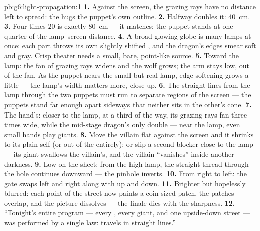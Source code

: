\begin{solution}{pb:g6:light-propagation:1}
\textbf{1.} Against the screen, the grazing rays have no distance
left to spread: the  hugs the puppet's own outline.
\textbf{2.} Halfway doubles it: \qty{40}{cm}.
\textbf{3.} Four times $20$ is exactly \qty{80}{cm} --- it
matches; the puppet stands at one quarter of the lamp--screen
distance.
\textbf{4.} A broad glowing globe is many lamps at once: each
part throws its own slightly shifted , and the dragon's
edges smear soft and gray. Crisp theater needs a small, bare,
point-like source.
\textbf{5.} Toward the lamp: the fan of grazing rays widens and
the wolf grows; the arm stays low, out of the fan. As the puppet
nears the small-but-real lamp, edge softening grows a little ---
the lamp's width matters more, close up.
\textbf{6.} The straight lines from the lamp through the two
puppets must run to separate regions of the screen --- the
puppets stand far enough apart sideways that neither sits in the
other's  cone.
\textbf{7.} The hand's: closer to the lamp, at a third of the
way, its grazing rays fan three times wide, while the mid-stage
dragon's only double --- near the lamp, even small hands play
giants.
\textbf{8.} Move the villain flat against the screen and it
shrinks to its plain self (or out of the  entirely); or slip
a second blocker close to the lamp --- its giant  swallows
the villain's, and the villain ``vanishes'' inside another
darkness.
\textbf{9.} Low on the sheet: from the high lamp, the straight
thread through the hole continues downward --- the pinhole
inverts.
\textbf{10.} From right to left: the gate swaps left and right
along with up and down.
\textbf{11.} Brighter but hopelessly blurred: each point of the
street now paints a coin-sized patch, the patches overlap, and
the picture dissolves --- the finale dies with the sharpness.
\textbf{12.} ``Tonight's entire program --- every , every
giant, and one upside-down street --- was performed by a single
law:  travels in straight lines.''
\end{solution}
